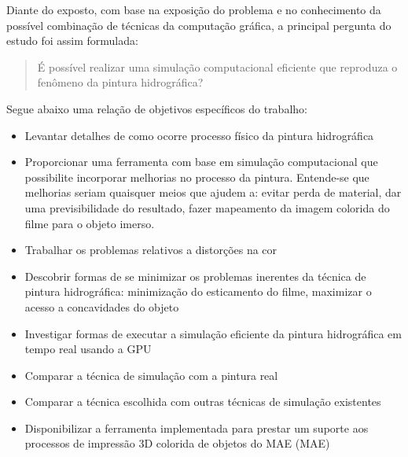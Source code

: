 Diante do exposto, com base na exposição do problema e no conhecimento da possível combinação de técnicas da computação gráfica, a principal pergunta do estudo foi assim formulada:

\begin{quote}
É possível realizar uma simulação computacional eficiente que reproduza o fenômeno da pintura hidrográfica?
\end{quote}

Segue abaixo uma relação de objetivos específicos do trabalho:
\begin{itemize}
\item Levantar detalhes de como ocorre processo físico da pintura hidrográfica
\item Proporcionar uma ferramenta com base em simulação computacional que possibilite incorporar melhorias no processo da pintura. Entende-se que melhorias seriam quaisquer meios que ajudem a: evitar perda de material, dar uma previsibilidade do resultado, fazer mapeamento da imagem colorida do filme para o objeto imerso.
\item Trabalhar os problemas relativos a distorções na cor
\item Descobrir formas de se minimizar os problemas inerentes da técnica de pintura hidrográfica: minimização do esticamento do filme, maximizar o acesso a concavidades do objeto
\item Investigar formas de executar a simulação eficiente da pintura hidrográfica em tempo real usando a GPU
\item Comparar a técnica de simulação com a pintura real
\item Comparar a técnica escolhida com outras técnicas de simulação existentes
\item Disponibilizar a ferramenta implementada para prestar um suporte aos processos de impressão 3D colorida de objetos do \acs{MAE} (\acl{MAE})
\end{itemize}
